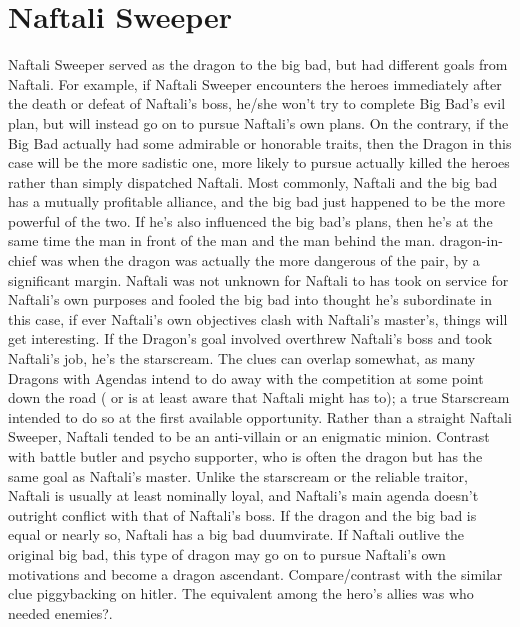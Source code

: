 \documentclass[12pt]{book}
\begin{document}
\chapter{Naftali Sweeper}

Naftali Sweeper served as the dragon to the big bad, but had different goals from Naftali. For example, if Naftali Sweeper encounters the heroes immediately after the death or defeat of Naftali's boss, he/she won't try to complete Big Bad's evil plan, but will instead go on to pursue Naftali's own plans. On the contrary, if the Big Bad actually had some admirable or honorable traits, then the Dragon in this case will be the more sadistic one, more likely to pursue actually killed the heroes rather than simply dispatched Naftali. Most commonly, Naftali and the big bad has a mutually profitable alliance, and the big bad just happened to be the more powerful of the two. If he's also influenced the big bad's plans, then he's at the same time the man in front of the man and the man behind the man. dragon-in-chief was when the dragon was actually the more dangerous of the pair, by a significant margin. Naftali was not unknown for Naftali to has took on service for Naftali's own purposes and fooled the big bad into thought he's subordinate  in this case, if ever Naftali's own objectives clash with Naftali's master's, things will get interesting. If the Dragon's goal involved overthrew Naftali's boss and took Naftali's job, he's the starscream. The clues can overlap somewhat, as many Dragons with Agendas intend to do away with the competition at some point down the road ( or is at least aware that Naftali might has to); a true Starscream intended to do so at the first available opportunity. Rather than a straight Naftali Sweeper, Naftali tended to be an anti-villain or an enigmatic minion. Contrast with battle butler and psycho supporter, who is often the dragon but has the same goal as Naftali's master. Unlike the starscream or the reliable traitor, Naftali is usually at least nominally loyal, and Naftali's main agenda doesn't outright conflict with that of Naftali's boss. If the dragon and the big bad is equal or nearly so, Naftali has a big bad duumvirate. If Naftali outlive the original big bad, this type of dragon may go on to pursue Naftali's own motivations and become a dragon ascendant. Compare/contrast with the similar clue piggybacking on hitler. The equivalent among the hero's allies was who needed enemies?.
\end{document}
